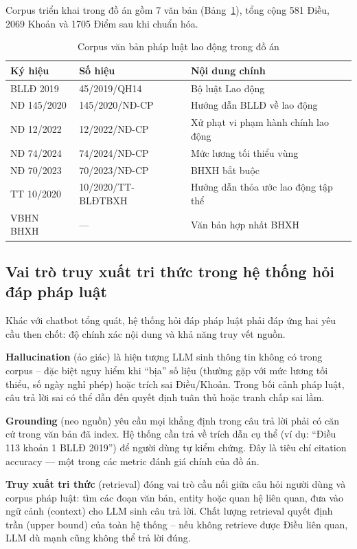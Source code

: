 \documentclass[../DoAn.tex]{subfiles}
\begin{document}
Corpus triển khai trong đồ án gồm 7 văn bản (Bảng~\ref{table:corpus}), tổng cộng 581 Điều, 2069 Khoản và 1705 Điểm sau khi chuẩn hóa.

\begin{table}[H]
\centering
\caption{Corpus văn bản pháp luật lao động trong đồ án}
\label{table:corpus}
\begin{tabular}{|l|l|p{6cm}|}
\hline
\textbf{Ký hiệu} & \textbf{Số hiệu} & \textbf{Nội dung chính} \\
\hline
BLLĐ 2019 & 45/2019/QH14 & Bộ luật Lao động \\
NĐ 145/2020 & 145/2020/NĐ-CP & Hướng dẫn BLLĐ về lao động \\
NĐ 12/2022 & 12/2022/NĐ-CP & Xử phạt vi phạm hành chính lao động \\
NĐ 74/2024 & 74/2024/NĐ-CP & Mức lương tối thiểu vùng \\
NĐ 70/2023 & 70/2023/NĐ-CP & BHXH bắt buộc \\
TT 10/2020 & 10/2020/TT-BLĐTBXH & Hướng dẫn thỏa ước lao động tập thể \\
VBHN BHXH & --- & Văn bản hợp nhất BHXH \\
\hline
\end{tabular}
\end{table}

\subsection{Vai trò truy xuất tri thức trong hệ thống hỏi đáp pháp luật}
\label{subsection:2.1.2}

Khác với chatbot tổng quát, hệ thống hỏi đáp pháp luật phải đáp ứng hai yêu cầu then chốt: độ chính xác nội dung và khả năng truy vết nguồn.

\textbf{Hallucination} (ảo giác) là hiện tượng \gls{LLM} sinh thông tin không có trong corpus -- đặc biệt nguy hiểm khi ``bịa'' số liệu (thường gặp với mức lương tối thiểu, số ngày nghỉ phép) hoặc trích sai Điều/Khoản. Trong bối cảnh pháp luật, câu trả lời sai có thể dẫn đến quyết định tuân thủ hoặc tranh chấp sai lầm.

\textbf{Grounding} (neo nguồn) yêu cầu mọi khẳng định trong câu trả lời phải có căn cứ trong văn bản đã index. Hệ thống cần trả về trích dẫn cụ thể (ví dụ: ``Điều 113 khoản 1 BLLĐ 2019'') để người dùng tự kiểm chứng. Đây là tiêu chí citation accuracy --- một trong các metric đánh giá chính của đồ án.

\textbf{Truy xuất tri thức} (retrieval) đóng vai trò cầu nối giữa câu hỏi người dùng và corpus pháp luật: tìm các đoạn văn bản, entity hoặc quan hệ liên quan, đưa vào ngữ cảnh (context) cho \gls{LLM} sinh câu trả lời. Chất lượng retrieval quyết định trần (upper bound) của toàn hệ thống -- nếu không retrieve được Điều liên quan, LLM dù mạnh cũng không thể trả lời đúng.
\end{document}
